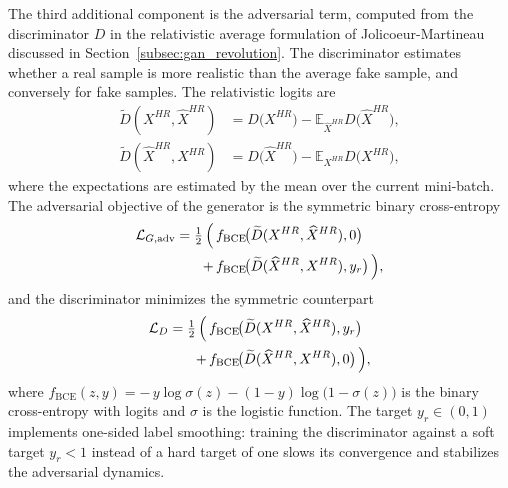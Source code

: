 The third additional component is the adversarial term, computed from the discriminator $D$ in the relativistic average formulation of Jolicoeur-Martineau~\cite{jolicoeur2018relativistic} discussed in Section~\ref{subsec:gan_revolution}. The discriminator estimates whether a real sample is more realistic than the average fake sample, and conversely for fake samples. The relativistic logits are
\begin{equation}
\begin{aligned}
    \widetilde{D}(X^{HR}, \widehat{X}^{HR}) &= D\!\bigl(X^{HR}\bigr) - \mathbb{E}_{\widehat{X}^{HR}} D\!\bigl(\widehat{X}^{HR}\bigr), \\
    \widetilde{D}(\widehat{X}^{HR}, X^{HR}) &= D\!\bigl(\widehat{X}^{HR}\bigr) - \mathbb{E}_{X^{HR}} D\!\bigl(X^{HR}\bigr),
\end{aligned}
\label{eq:loss_ragan_logits}
\end{equation}
where the expectations are estimated by the mean over the current mini-batch. The adversarial objective of the generator is the symmetric binary cross-entropy
\begin{equation}
\begin{aligned}
    \mathcal{L}_{G,\mathrm{adv}} = \tfrac{1}{2} \, \Bigl( \, &f_{\mathrm{BCE}}\!\bigl(\widetilde{D}(X^{HR}, \widehat{X}^{HR}), 0\bigr) \\
    + \, &f_{\mathrm{BCE}}\!\bigl(\widetilde{D}(\widehat{X}^{HR}, X^{HR}), y_{r}\bigr) \, \Bigr),
\end{aligned}
\label{eq:loss_g_adv}
\end{equation}
and the discriminator minimizes the symmetric counterpart
\begin{equation}
\begin{aligned}
    \mathcal{L}_{D} = \tfrac{1}{2} \, \Bigl( \, &f_{\mathrm{BCE}}\!\bigl(\widetilde{D}(X^{HR}, \widehat{X}^{HR}), y_{r}\bigr) \\
    + \, &f_{\mathrm{BCE}}\!\bigl(\widetilde{D}(\widehat{X}^{HR}, X^{HR}), 0\bigr) \, \Bigr),
\end{aligned}
\label{eq:loss_d}
\end{equation}
where $f_{\mathrm{BCE}}(z, y) = -\, y \log \sigma(z) - (1 - y) \log\bigl(1 - \sigma(z)\bigr)$ is the binary cross-entropy with logits and $\sigma$ is the logistic function. The target $y_{r} \in (0, 1)$ implements one-sided label smoothing: training the discriminator against a soft target $y_{r} < 1$ instead of a hard target of one slows its convergence and stabilizes the adversarial dynamics.

